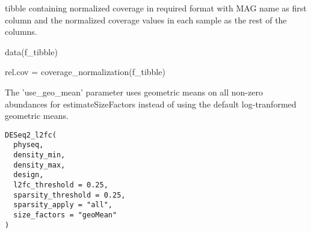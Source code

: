 \documentclass[a4paper]{book}
\begin{document}
%
\begin{Value}
tibble containing normalized coverage in required format with MAG name as first column and the normalized coverage values in each sample as the rest of the columns.
\end{Value}
%
\begin{Examples}
\begin{ExampleCode}

data(f_tibble)

rel.cov = coverage_normalization(f_tibble)


\end{ExampleCode}
\end{Examples}
%
\begin{Description}\relax
The 'use\_geo\_mean' parameter uses geometric means on all non-zero abundances
for estimateSizeFactors instead of using the default log-tranformed geometric means.
\end{Description}
%
\begin{Usage}
\begin{verbatim}
DESeq2_l2fc(
  physeq,
  density_min,
  density_max,
  design,
  l2fc_threshold = 0.25,
  sparsity_threshold = 0.25,
  sparsity_apply = "all",
  size_factors = "geoMean"
)
\end{verbatim}
\end{Usage}
%
\end{document}

